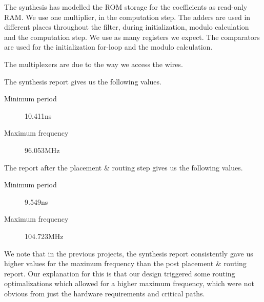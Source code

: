 The synthesis has modelled the ROM storage for the coefficients as read-only RAM.
We use one multiplier, in the computation step.
The adders are used in different places throughout the filter, during initialization, modulo calculation and the computation step.
We use as many registers we expect.
The comparators are used for the initialization for-loop and the modulo calculation.

The multiplexers are due to the way we access the wires.

The synthesis report gives us the following values.
\begin{description}
	\item[Minimum period] 10.411ns
	\item[Maximum frequency] 96.053MHz
\end{description}

The report after the placement \& routing step gives us the following values.
\begin{description}
	\item[Minimum period] 9.549ns
	\item[Maximum frequency] 104.723MHz
\end{description}

We note that in the previous projects, the synthesis report consistently gave us higher values for the maximum frequency than the post placement \& routing report.
Our explanation for this is that our design triggered some routing optimalizations which allowed for a higher maximum frequency, which were not obvious from just the hardware requirements and critical paths.
